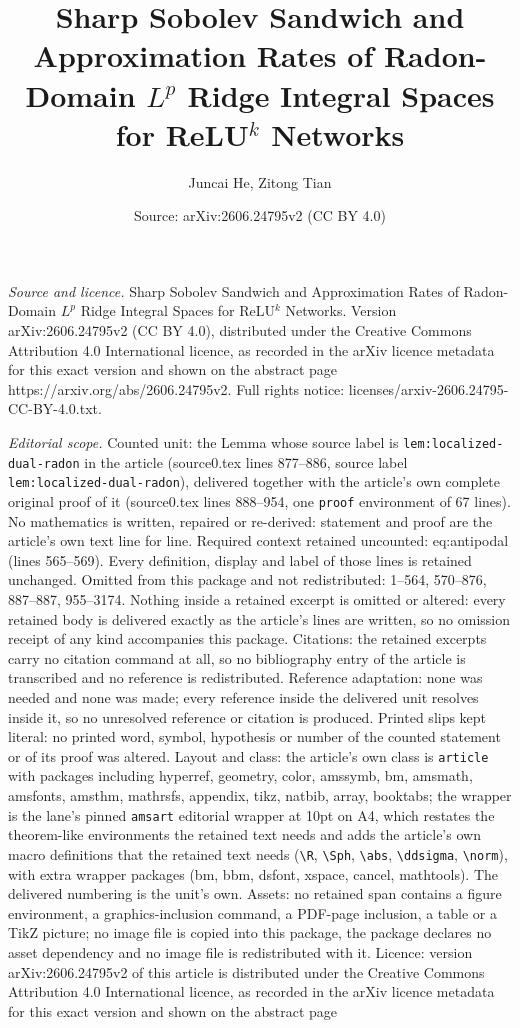 \documentclass[10pt,a4paper]{amsart}
\title[Sharp Sobolev Sandwich and Approximation Rates of Radon-Doma]{Sharp Sobolev Sandwich and Approximation Rates of Radon-Domain $L^p$ Ridge Integral Spaces for ReLU$^k$ Networks}
\author{Juncai He, Zitong Tian}
\date{Source: arXiv:2606.24795v2 (CC BY 4.0)}
\begin{document}
\maketitle

\noindent\emph{Source and licence.} Sharp Sobolev Sandwich and Approximation Rates of Radon-Domain $L^p$ Ridge Integral Spaces for ReLU$^k$ Networks. Version arXiv:2606.24795v2 (CC BY 4.0), distributed under the Creative Commons Attribution 4.0 International licence, as recorded in the arXiv licence metadata for this exact version and shown on the abstract page https://arxiv.org/abs/2606.24795v2. Full rights notice: licenses/arxiv-2606.24795-CC-BY-4.0.txt.\par\smallskip

\noindent\textit{Editorial scope.} Counted unit: the Lemma whose source label is \texttt{lem:localized-dual-radon} in the article (source0.tex lines 877--886, source label \texttt{lem:localized-dual-radon}), delivered together with the article's own complete original proof of it (source0.tex lines 888--954, one \texttt{proof} environment of 67 lines). No mathematics is written, repaired or re-derived: statement and proof are the article's own text line for line. Required context retained uncounted: eq:antipodal (lines 565--569). Every definition, display and label of those lines is retained unchanged. Omitted from this package and not redistributed: 1--564, 570--876, 887--887, 955--3174. Nothing inside a retained excerpt is omitted or altered: every retained body is delivered exactly as the article's lines are written, so no omission receipt of any kind accompanies this package. Citations: the retained excerpts carry no citation command at all, so no bibliography entry of the article is transcribed and no reference is redistributed. Reference adaptation: none was needed and none was made; every reference inside the delivered unit resolves inside it, so no unresolved reference or citation is produced. Printed slips kept literal: no printed word, symbol, hypothesis or number of the counted statement or of its proof was altered. Layout and class: the article's own class is \texttt{article} with packages including hyperref, geometry, color, amssymb, bm, amsmath, amsfonts, amsthm, mathrsfs, appendix, tikz, natbib, array, booktabs; the wrapper is the lane's pinned \texttt{amsart} editorial wrapper at 10pt on A4, which restates the theorem-like environments the retained text needs and adds the article's own macro definitions that the retained text needs (\texttt{\textbackslash R}, \texttt{\textbackslash Sph}, \texttt{\textbackslash abs}, \texttt{\textbackslash ddsigma}, \texttt{\textbackslash norm}), with extra wrapper packages (bm, bbm, dsfont, xspace, cancel, mathtools). The delivered numbering is the unit's own. Assets: no retained span contains a figure environment, a graphics-inclusion command, a PDF-page inclusion, a table or a TikZ picture; no image file is copied into this package, the package declares no asset dependency and no image file is redistributed with it. Licence: version arXiv:2606.24795v2 of this article is distributed under the Creative Commons Attribution 4.0 International licence, as recorded in the arXiv licence metadata for this exact version and shown on the abstract page 
\end{document}

